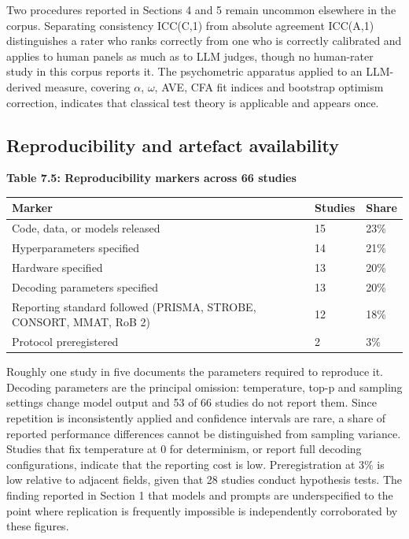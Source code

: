 \documentclass[11pt]{article}
\begin{document}
	Two procedures reported in Sections 4 and 5 remain uncommon elsewhere in the corpus. Separating consistency ICC(C,1) from absolute agreement ICC(A,1) distinguishes a rater who ranks correctly from one who is correctly calibrated and applies to human panels as much as to LLM judges, though no human-rater study in this corpus reports it. The psychometric apparatus applied to an LLM-derived measure, covering $\alpha$, $\omega$, AVE, CFA fit indices and bootstrap optimism correction, indicates that classical test theory is applicable and appears once.
	
	\subsection{Reproducibility and artefact availability}
	
	\begin{center}
		\textbf{Table 7.5: Reproducibility markers across 66 studies}
		\vspace{2pt}
		
		\footnotesize
		\setlength{\tabcolsep}{3pt}\renewcommand{\arraystretch}{1.1}
		\begin{tabularx}{\textwidth}{|X|X|X|}
			\hline
			\textbf{Marker} & \textbf{Studies} & \textbf{Share} \\
			\hline
			Code, data, or models released & 15 & 23\% \\
			\hline
			Hyperparameters specified & 14 & 21\% \\
			\hline
			Hardware specified & 13 & 20\% \\
			\hline
			Decoding parameters specified & 13 & 20\% \\
			\hline
			Reporting standard followed (PRISMA, STROBE, CONSORT, MMAT, RoB 2) & 12 & 18\% \\
			\hline
			Protocol preregistered & 2 & 3\% \\
			\hline
		\end{tabularx}
	\end{center}
	
	Roughly one study in five documents the parameters required to reproduce it. Decoding parameters are the principal omission: temperature, top-p and sampling settings change model output and 53 of 66 studies do not report them. Since repetition is inconsistently applied and confidence intervals are rare, a share of reported performance differences cannot be distinguished from sampling variance. Studies that fix temperature at 0 for determinism, or report full decoding configurations, indicate that the reporting cost is low. Preregistration at 3\% is low relative to adjacent fields, given that 28 studies conduct hypothesis tests. The finding reported in Section 1 that models and prompts are underspecified to the point where replication is frequently impossible is independently corroborated by these figures.
	
\end{document}
